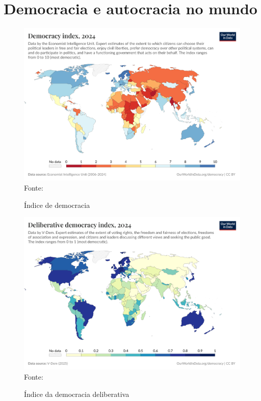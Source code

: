\chapter{Democracia e autocracia no mundo}
\label{demo_auto_mundo}

\begin{figure}[ht]
    \centering
    \caption{Índice de democracia}
    \includegraphics[width=1\linewidth]{figuras/democracia/democracy-index-eiu.png}
    \label{fig:democracy-index-eiu}
    \footnotesize{Fonte: \cite{electoral_democracy_eiu}}
\end{figure}

\begin{figure}[ht]
    \centering
    \caption{Índice da democracia deliberativa}
    \includegraphics[width=1\linewidth]{figuras/democracia/deliberative-democracy-index-vdem.png}
    \label{fig:deliberative-democracy-index-vdem}
    \footnotesize{Fonte: \cite{deliberative_democracy_index_vdem}}
\end{figure}

